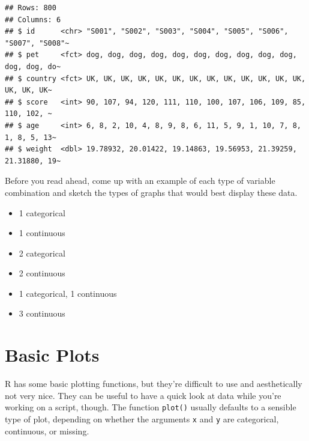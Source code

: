 \documentclass[
  oneside]{book}
\newenvironment{Shaded}{\begin{snugshade}}{\end{snugshade}}
\newcommand{\AttributeTok}[1]{\textcolor[rgb]{0.77,0.63,0.00}{#1}}
\newcommand{\FunctionTok}[1]{\textcolor[rgb]{0.00,0.00,0.00}{#1}}
\newcommand{\NormalTok}[1]{#1}
\newcommand{\SpecialCharTok}[1]{\textcolor[rgb]{0.00,0.00,0.00}{#1}}
\providecommand{\tightlist}{%
  \setlength{\itemsep}{0pt}\setlength{\parskip}{0pt}}
\begin{document}
\begin{verbatim}
## Rows: 800
## Columns: 6
## $ id      <chr> "S001", "S002", "S003", "S004", "S005", "S006", "S007", "S008"~
## $ pet     <fct> dog, dog, dog, dog, dog, dog, dog, dog, dog, dog, dog, dog, do~
## $ country <fct> UK, UK, UK, UK, UK, UK, UK, UK, UK, UK, UK, UK, UK, UK, UK, UK~
## $ score   <int> 90, 107, 94, 120, 111, 110, 100, 107, 106, 109, 85, 110, 102, ~
## $ age     <int> 6, 8, 2, 10, 4, 8, 9, 8, 6, 11, 5, 9, 1, 10, 7, 8, 1, 8, 5, 13~
## $ weight  <dbl> 19.78932, 20.01422, 19.14863, 19.56953, 21.39259, 21.31880, 19~
\end{verbatim}

\begin{try}

Before you read ahead, come up with an example of each type of variable combination and sketch the types of graphs that would best display these data.

\begin{itemize}
\tightlist
\item
  1 categorical
\item
  1 continuous
\item
  2 categorical
\item
  2 continuous
\item
  1 categorical, 1 continuous
\item
  3 continuous
\end{itemize}

\end{try}

\hypertarget{basic-plots}{%
\section{Basic Plots}\label{basic-plots}}

R has some basic plotting functions, but they're difficult to use and aesthetically not very nice. They can be useful to have a quick look at data while you're working on a script, though. The function \texttt{plot()} usually defaults to a sensible type of plot, depending on whether the arguments \texttt{x} and \texttt{y} are categorical, continuous, or missing.

\begin{Shaded}
\end{Shaded}
\end{document}
